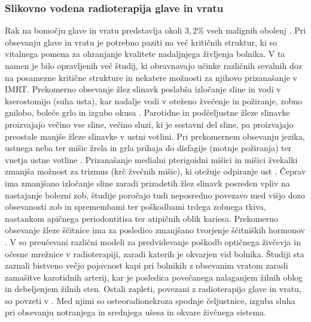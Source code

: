 \documentclass[a4paper,twoside,11pt]{article}
\begin{document}
	\subsubsection*{Slikovno vodena radioterapija glave in vratu}
	\par{
	  Rak na bomočju glave in vratu predstavlja okoli $3,2\%$ vseh malignih obolenj \cite{torre2015}. Pri obsevanju glave in vratu je potrebno paziti na več kritičnih struktur, ki so vitalnega pomena za ohranjanje kvalitete nadaljnjega življenja bolnika. V ta namen je bilo opravljenih več študij, ki obravnavajo učinke različnih sevalnih doz na posamezne kritične strukture in nekatere možnosti za njihovo prizanašanje v IMRT. Prekomerno obsevanje žlez slinavk poslabša izločanje sline in vodi v kserostomijo (suha usta), kar nadalje vodi v oteženo žvečenje in požiranje, zobno gnilobo, boleče grlo in izgubo okusa \cite{bhide2009,beetz2012,marzi2012,lee2014,yuan2014,vanluijk2015,tuomikoski2015,eisbruch2009}. Parotidne in podčeljustne žleze slinavke proizvajajo večino vse sline, večino sluzi, ki je sestavni del sline, pa proizvajajo preostale manjše žleze slinavke v ustni votlini. Pri prekomernem obsevanju jezika, ustnega neba ter mišic žrela in grla prihaja do disfagije (motnje požiranja) ter vnetja ustne votline \cite{christianen2016,vanderlaan2015,dehing-oberije2010}. Prizanašanje medialni pterigoidni mišici in mišici žvekalki zmanjša možnost za trizmus (krč žvečnih mišic), ki otežuje odpiranje ust \cite{rao2016}. Čeprav ima zmanjšano izločanje sline zaradi prizadetih žlez slinavk posreden vpliv na nastajanje bolezni zob, študije \cite{hommez2012,lieshout2014,deng2015} poročajo tudi neposredno povezavo med višjo dozo obsevanosti zob in spremembami ter poškodbami trdega zobnega tkiva, nastankom apičnega periodontitisa ter atipičnih oblik kariesa. Prekomerno obsevanje žleze ščitnice ima za posledico zmanjšano tvorjenje ščitniških hormonov \cite{kim2014}. V \cite{moiseenko2011} so preučevani različni modeli za predvidevanje poškodb optičnega živčevja in očesne mrežnice v radioterapiji, zaradi katerih je okvarjen vid bolnika. Študiji \cite{scott2009,gujral2014} sta zaznali bistveno večjo pojavnost kapi pri bolnikih z obsevanim vratom zaradi zamašitve karotidnih arterij, kar je posledica povečanega nalaganjem žilnih oblog in debeljenjem žilnih sten. Ostali zapleti, povezani z radioterapijo glave in vratu, so povzeti v \cite{wang2011}. Med njimi so osteoradionekroza spodnje čeljustnice, izguba sluha pri obsevanju notranjega in srednjega ušesa in okvare živčnega sistema.
	}
	  
\end{document}
